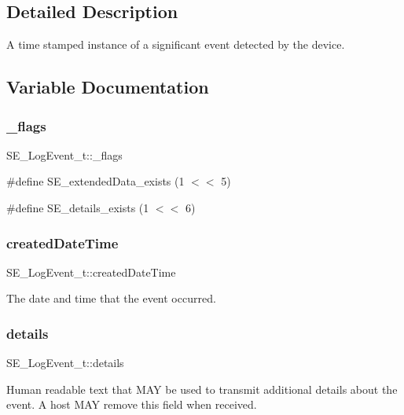 \subsection{Detailed Description}
A time stamped instance of a significant event detected by the device. 

\subsection{Variable Documentation}
\mbox{\label{group__LogEvent_ga7097aa812a92768f9a6444ad1f44e7ab}} 
\subsubsection{\texorpdfstring{\+\_\+flags}{\_flags}}
{\footnotesize\ttfamily S\+E\+\_\+\+Log\+Event\+\_\+t\+::\+\_\+flags}

\#define S\+E\+\_\+extended\+Data\+\_\+exists (1 $<$$<$ 5)

\#define S\+E\+\_\+details\+\_\+exists (1 $<$$<$ 6) \mbox{\label{group__LogEvent_gacaa033ae90debff32b1e3d913b02b1e0}} 
\subsubsection{\texorpdfstring{created\+Date\+Time}{createdDateTime}}
{\footnotesize\ttfamily S\+E\+\_\+\+Log\+Event\+\_\+t\+::created\+Date\+Time}

The date and time that the event occurred. \mbox{\label{group__LogEvent_gab8efc7faed19706fb29eae8aaae704e3}} 
\subsubsection{\texorpdfstring{details}{details}}
{\footnotesize\ttfamily S\+E\+\_\+\+Log\+Event\+\_\+t\+::details}

Human readable text that M\+AY be used to transmit additional details about the event. A host M\+AY remove this field when received. \mbox{\label{group__LogEvent_ga335ea28cf8492d2ae95aaa2af959d78b}} 

